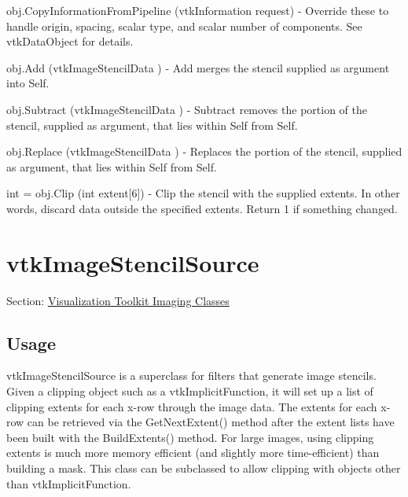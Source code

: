 \begin{DoxyItemize}
\item {\ttfamily obj.\-Copy\-Information\-From\-Pipeline (vtk\-Information request)} -\/ Override these to handle origin, spacing, scalar type, and scalar number of components. See vtk\-Data\-Object for details.  
\item {\ttfamily obj.\-Add (vtk\-Image\-Stencil\-Data )} -\/ Add merges the stencil supplied as argument into Self.  
\item {\ttfamily obj.\-Subtract (vtk\-Image\-Stencil\-Data )} -\/ Subtract removes the portion of the stencil, supplied as argument, that lies within Self from Self.  
\item {\ttfamily obj.\-Replace (vtk\-Image\-Stencil\-Data )} -\/ Replaces the portion of the stencil, supplied as argument, that lies within Self from Self.  
\item {\ttfamily int = obj.\-Clip (int extent\mbox{[}6\mbox{]})} -\/ Clip the stencil with the supplied extents. In other words, discard data outside the specified extents. Return 1 if something changed.  
\end{DoxyItemize}\hypertarget{vtkimaging_vtkimagestencilsource}{}\section{vtk\-Image\-Stencil\-Source}\label{vtkimaging_vtkimagestencilsource}
Section\-: \hyperlink{sec_vtkimaging}{Visualization Toolkit Imaging Classes} \hypertarget{vtkwidgets_vtkxyplotwidget_Usage}{}\subsection{Usage}\label{vtkwidgets_vtkxyplotwidget_Usage}
vtk\-Image\-Stencil\-Source is a superclass for filters that generate image stencils. Given a clipping object such as a vtk\-Implicit\-Function, it will set up a list of clipping extents for each x-\/row through the image data. The extents for each x-\/row can be retrieved via the Get\-Next\-Extent() method after the extent lists have been built with the Build\-Extents() method. For large images, using clipping extents is much more memory efficient (and slightly more time-\/efficient) than building a mask. This class can be subclassed to allow clipping with objects other than vtk\-Implicit\-Function.

